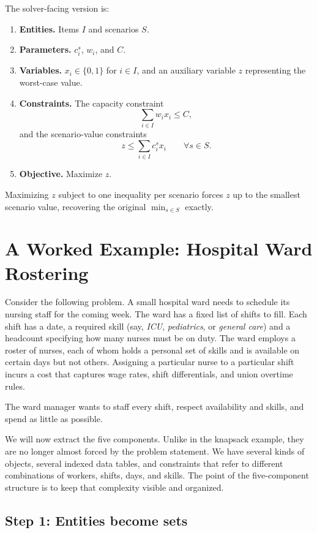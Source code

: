 The solver-facing version is:

\begin{enumerate}
\item
  \textbf{Entities.} Items \(I\) and scenarios \(S\).
\item
  \textbf{Parameters.} \(c_i^s\), \(w_i\), and \(C\).
\item
  \textbf{Variables.} \(x_i \in \{0, 1\}\) for \(i \in I\), and an
  auxiliary variable \(z\) representing the worst-case value.
\item
  \textbf{Constraints.} The capacity constraint \[
  \sum_{i \in I} w_i x_i \le C,
  \] and the scenario-value constraints \[
  z \le \sum_{i \in I} c_i^s x_i \qquad \forall s \in S.
  \]
\item
  \textbf{Objective.} Maximize \(z\).
\end{enumerate}

Maximizing \(z\) subject to one inequality per scenario forces \(z\) up
to the smallest scenario value, recovering the original
\(\min_{s \in S}\) exactly.

\section{A Worked Example: Hospital Ward Rostering}\label{sec:3.2}

Consider the following problem. A small hospital ward needs to schedule
its nursing staff for the coming week. The ward has a fixed list of
shifts to fill. Each shift has a date, a required skill (say,
\emph{ICU}, \emph{pediatrics}, or \emph{general care}) and a
headcount specifying how many nurses must be on duty. The ward employs a
roster of nurses, each of whom holds a personal set of skills and is
available on certain days but not others. Assigning a particular nurse
to a particular shift incurs a cost that captures wage rates, shift
differentials, and union overtime rules.

The ward manager wants to staff every shift, respect availability and
skills, and spend as little as possible.

We will now extract the five components. Unlike in the knapsack example,
they are no longer almost forced by the problem statement. We have
several kinds of objects, several indexed data tables, and constraints
that refer to different combinations of workers, shifts, days, and
skills. The point of the five-component structure is to keep that
complexity visible and organized.

\subsection{Step 1: Entities become sets}\label{step-1-entities-become-sets}

